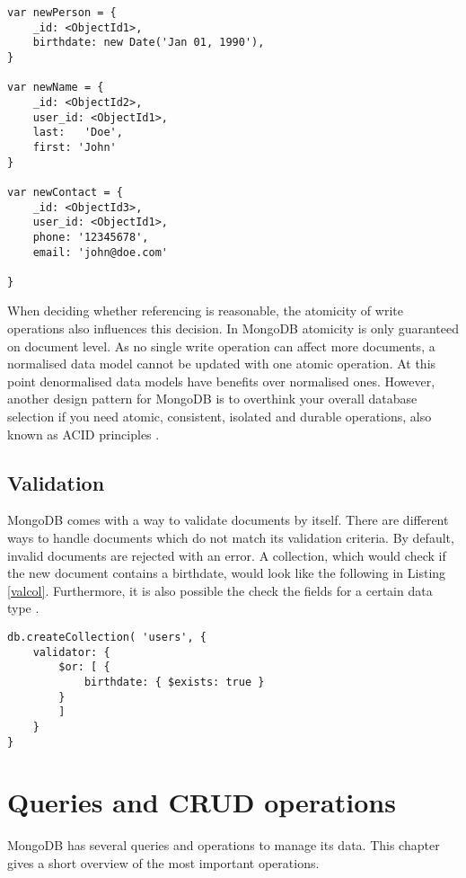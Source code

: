 \begin{lstlisting}[frame=single, caption=Referencing Documents, label=refdoc]
var newPerson = {
	_id: <ObjectId1>,
	birthdate: new Date('Jan 01, 1990'), 
}

var newName = {
	_id: <ObjectId2>,
	user_id: <ObjectId1>,	
    last:	'Doe', 
    first: 'John'
}

var newContact = {
    _id: <ObjectId3>,
    user_id: <ObjectId1>,	
    phone: '12345678',
	email: 'john@doe.com'

}
\end{lstlisting}

When deciding whether referencing is reasonable, the atomicity of write operations also influences this decision. In MongoDB atomicity is only guaranteed on document level. As no single write operation can affect more documents, a normalised data model cannot be updated with one atomic operation. At this point denormalised data models have benefits over normalised ones. However, another design pattern for MongoDB is to overthink your overall database selection if you need atomic, consistent, isolated and durable operations, also known as ACID principles \cite{Banker2016}. 

\subsection{Validation}
MongoDB comes with a way to validate documents by itself. There are different ways to handle documents which do not match its validation criteria. By default, invalid documents are rejected with an error. A collection, which would check if the new document contains a birthdate, would look like the following in Listing \ref{valcol}. Furthermore, it is also possible the check the fields for a certain data type \cite{mdbdocu}.

\begin{lstlisting}[frame=single, caption=Validation for Collections, label=valcol]
db.createCollection( 'users', {
	validator: { 
	    $or: [ { 
	        birthdate: { $exists: true } 
	    } 
        ] 
    }
}
\end{lstlisting}
		
\section{Queries and CRUD operations}
MongoDB has several queries and operations to manage its data. This chapter gives a short overview of the most important operations.

